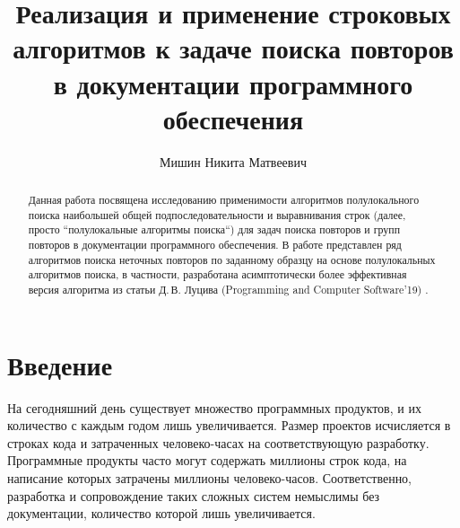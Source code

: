 \def\mcirc{\mathbin{\scalerel*{\circ}{j}}}
\def\msquare{\mathord{\scalerel*{\Box}{gX}}}


\title{Реализация и применение строковых алгоритмов к задаче поиска
повторов в документации программного обеспечения}


\author{Мишин Никита Матвеевич}



\maketitle


\begin{abstract}
Данная работа посвящена исследованию применимости алгоритмов полулокального поиска наибольшей общей подпоследовательности и выравнивания строк (далее, просто ``полулокальные алгоритмы поиска``) для задач поиска повторов и групп повторов в документации программного обеспечения.
В работе представлен ряд алгоритмов поиска неточных повторов по заданному образцу на основе полулокальных алгоритмов поиска, в частности, разработана асимптотически более эффективная версия алгоритма из статьи Д.\,В. Луцива  (Programming and Computer Software’19) .
\end{abstract}

\section*{Введение}

На сегодняшний день существует множество программных продуктов, и их количество с каждым годом лишь увеличивается.
Размер проектов исчисляется в строках кода и затраченных человеко-часах на соответствующую разработку.
Программные продукты часто могут содержать миллионы строк кода, на написание которых затрачены миллионы человеко-часов.
Соответственно, разработка и сопровождение таких сложных систем немыслимы без документации, количество которой лишь увеличивается.

